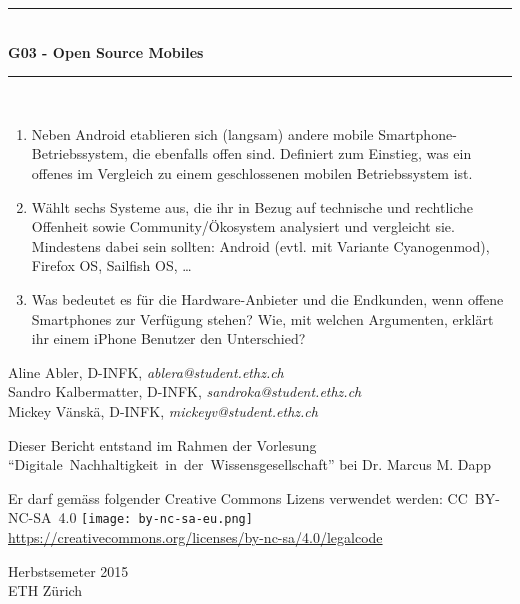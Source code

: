 \begin{titlepage}

\thispagestyle{plain}
\fancyhead{}
\fancyfoot{}

\begin{center}
\vspace{3.5cm}
\rule{\linewidth}{0.5mm} \\[0.4cm]
\textbf{\huge G03 - Open Source Mobiles} \\
\rule{\linewidth}{0.5mm} \\
\vspace{3\baselineskip}
\end{center}
\begin{large}
\begin{enumerate}
    \item Neben Android etablieren sich (langsam) andere mobile Smartphone-Betriebssystem, die ebenfalls offen sind. Definiert zum Einstieg, was ein offenes im Vergleich zu einem geschlossenen mobilen Betriebssystem ist.

    \item Wählt sechs Systeme aus, die ihr in Bezug auf technische und rechtliche Offenheit sowie Community/Ökosystem analysiert und vergleicht sie. Mindestens dabei sein sollten: Android (evtl. mit Variante Cyanogenmod), Firefox OS, Sailfish OS, …

    \item Was bedeutet es für die Hardware-Anbieter und die Endkunden, wenn offene Smartphones zur Verfügung stehen? Wie, mit welchen Argumenten, erklärt ihr einem iPhone Benutzer den Unterschied?
\end{enumerate}

\begin{center}
\vfill

 Aline Abler, \textsc{D-INFK}, \emph{ablera@student.ethz.ch} \\
Sandro Kalbermatter, \textsc{D-INFK}, \emph{sandroka@student.ethz.ch} \\
Mickey Vänskä, \textsc{D-INFK}, \emph{mickeyv@student.ethz.ch} \\
\vspace{2\baselineskip}

Dieser Bericht entstand im Rahmen der Vorlesung \mbox{``Digitale Nachhaltigkeit in der Wissensgesellschaft''} bei Dr{.} Marcus M{.} Dapp \\
\vspace{2\baselineskip}

Er darf gemäss folgender Creative Commons Lizens verwendet werden: \mbox{CC BY-NC-SA 4.0} \texttt{[image: by-nc-sa-eu.png]}\\ \url{https://creativecommons.org/licenses/by-nc-sa/4.0/legalcode} \\
\vfill

Herbstsemeter 2015 \\
\vspace{0.5\baselineskip}
ETH Zürich

\end{center}
\end{large}

\end{titlepage}
